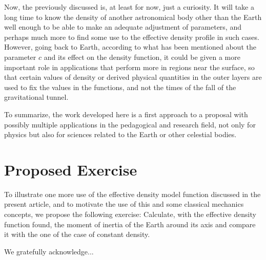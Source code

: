 \documentclass[aps,twocolumn,showpacs,preprintnumbers]{revtex4}
\begin{document}
    Now, the previously discussed is, at least for now, just a curiosity. It will take a long time to know the density of another astronomical body other than the Earth well enough to be able to make an adequate adjustment of parameters, and perhaps much more to find some use to the effective density profile in such cases. However, going back to Earth, according to what has been mentioned about the parameter $ c $ and its effect on the density function, it could be given a more important role in applications that perform more in regions near the surface, so that certain values of density or derived physical quantities in the outer layers are used to fix the values in the functions, and not the times of the fall of the gravitational tunnel.
    
   To summarize, the work developed here is a first approach to a proposal with possibly multiple applications in the pedagogical and research field, not only for physics but also for sciences related to the Earth or other celestial bodies.
    


\section{Proposed Exercise}

To illustrate one more use of the effective density model function discussed in the present article, and to motivate the use of this and some classical mechanics concepts, we propose the following exercise:
Calculate, with the effective density function found, the moment of inertia of the Earth around its axis and compare it with the one of the case of constant density.


\begin{acknowledgments}

We gratefully acknowledge...

\end{acknowledgments}
\end{document}
